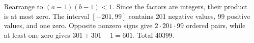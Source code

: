 Rearrange to $(a-1)(b-1)<1$. Since the factors are integers, their product is at most zero. The interval $[-201,99]$ contains 201 negative values, 99 positive values, and one zero. Opposite nonzero signs give $2\cdot201\cdot99$ ordered pairs, while at least one zero gives $301+301-1=601$. Total $\boxed{40399}$.
